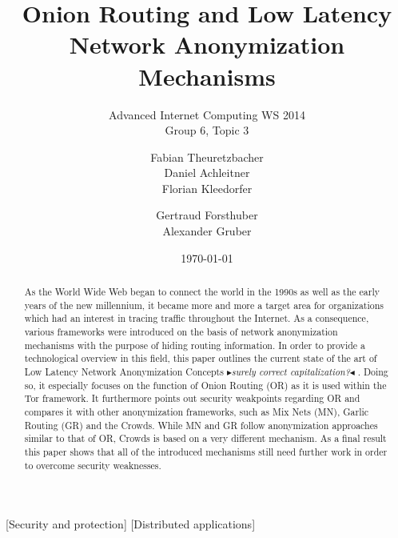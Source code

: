 \documentclass{sig-alternate}
\newcommand{\boxedtext}[1]{\fbox{\scriptsize\bfseries\textsf{#1}}}
\newcommand{\nota}[2]{
   \boxedtext{#1}
       {\small$\blacktriangleright$\emph{\textsl{#2}}$\blacktriangleleft$}
}
\newcommand\fk[1]{\nota{FK}{#1}}
\begin{document}
\title{Onion Routing and Low Latency Network Anonymization Mechanisms}
\subtitle{Advanced Internet Computing WS 2014 \\ Group 6, Topic 3}


\author{
\alignauthor
Fabian Theuretzbacher\\
\alignauthor
Daniel Achleitner\\
\alignauthor Florian Kleedorfer\\
\and  %
\alignauthor Gertraud Forsthuber\\
\alignauthor Alexander Gruber\\
\and
\and
{}
}

\date{\today}
\maketitle

\begin{abstract}

As the World Wide Web began to connect the world in the 1990s as well as the early years of the new millennium, it became more and more a target area for organizations which had an interest in tracing traffic throughout the Internet. As a consequence, various frameworks were introduced on the basis of network anonymization mechanisms with the purpose of hiding routing information. In order to provide a technological overview in this field, this paper outlines the current state of the art of Low Latency Network Anonymization Concepts\fk{surely correct capitalization?}. Doing so, it especially focuses on the function of Onion Routing (OR) as it is used within the Tor framework. It furthermore points out security weakpoints regarding OR and compares it with other anonymization frameworks, such as Mix Nets (MN), Garlic Routing (GR) and the Crowds. While MN and GR follow anonymization approaches similar to that of OR, Crowds is based on a very different mechanism. As a final result this paper shows that all of the introduced mechanisms still need further work in order to overcome security weaknesses.

\end{abstract}

[Security and protection]
[Distributed applications]
\end{document}
